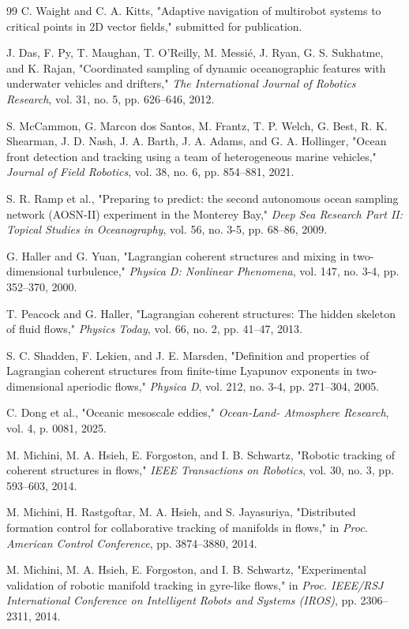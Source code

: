 \documentclass[lettersize,journal]{IEEEtran}
\begin{document}
\begin{thebibliography}{99}
 C. Waight and C. A. Kitts, "Adaptive navigation of multirobot
systems to critical points in 2D vector fields," submitted for publication.

 J. Das, F. Py, T. Maughan, T. O'Reilly, M. Messié, J. Ryan,
G. S. Sukhatme, and K. Rajan, "Coordinated sampling of dynamic oceanographic
features with underwater vehicles and drifters," \textit{The International
Journal of Robotics Research}, vol. 31, no. 5, pp. 626--646, 2012.

 S. McCammon, G. Marcon dos Santos, M. Frantz, T. P. Welch,
G. Best, R. K. Shearman, J. D. Nash, J. A. Barth, J. A. Adams, and
G. A. Hollinger, "Ocean front detection and tracking using a
team of heterogeneous marine vehicles," \textit{Journal of Field Robotics},
vol. 38, no. 6, pp. 854--881, 2021.

 S. R. Ramp et al., "Preparing to predict: the second autonomous
ocean sampling network (AOSN-II) experiment in the Monterey Bay,"
\textit{Deep Sea Research Part II: Topical Studies in Oceanography}, vol. 56,
no. 3-5, pp. 68--86, 2009.

 G. Haller and G. Yuan, "Lagrangian coherent structures and mixing
in two-dimensional turbulence," \textit{Physica D: Nonlinear Phenomena},
vol. 147, no. 3-4, pp. 352--370, 2000.

 T. Peacock and G. Haller, "Lagrangian coherent structures: The
hidden skeleton of fluid flows," \textit{Physics Today}, vol. 66, no. 2,
pp. 41--47, 2013.

 S. C. Shadden, F. Lekien, and J. E. Marsden, "Definition and
properties of Lagrangian coherent structures from finite-time Lyapunov
exponents in two-dimensional aperiodic flows," \textit{Physica D}, vol. 212,
no. 3-4, pp. 271--304, 2005.

 C. Dong et al., "Oceanic mesoscale eddies," \textit{Ocean-Land-
Atmosphere Research}, vol. 4, p. 0081, 2025.

 M. Michini, M. A. Hsieh, E. Forgoston, and I. B. Schwartz,
"Robotic tracking of coherent structures in flows," \textit{IEEE Transactions
on Robotics}, vol. 30, no. 3, pp. 593--603, 2014.

 M. Michini, H. Rastgoftar, M. A. Hsieh, and S. Jayasuriya,
"Distributed formation control for collaborative tracking of manifolds in
flows," in \textit{Proc. American Control Conference}, pp. 3874--3880, 2014.

 M. Michini, M. A. Hsieh, E. Forgoston, and I. B. Schwartz,
"Experimental validation of robotic manifold tracking in gyre-like flows,"
in \textit{Proc. IEEE/RSJ International Conference on Intelligent Robots
and Systems (IROS)}, pp. 2306--2311, 2014.


\end{thebibliography}
\end{document}
